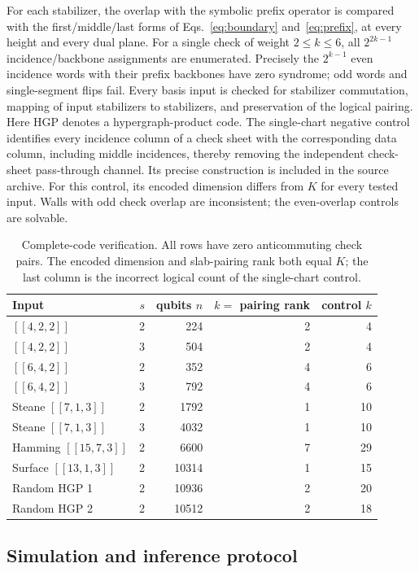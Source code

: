 For each stabilizer, the overlap with the symbolic prefix operator is
compared with the first/middle/last forms of Eqs.~\eqref{eq:boundary}
and~\eqref{eq:prefix}, at every height and every dual plane. For a single
check of weight $2\le k\le6$, all $2^{2k-1}$ incidence/backbone assignments
are enumerated. Precisely the $2^{k-1}$ even incidence words with their prefix
backbones have zero syndrome; odd words and single-segment flips fail.
Every basis input is checked for stabilizer commutation, mapping of input
stabilizers to stabilizers, and preservation of the logical pairing.
Here HGP denotes a hypergraph-product code. The single-chart negative
control identifies every incidence column of a check sheet with the
corresponding data column, including middle incidences, thereby removing
the independent check-sheet pass-through channel. Its precise construction
is included in the source archive. For this control, its encoded dimension
differs from $K$ for every tested input. Walls with odd check overlap are
inconsistent; the even-overlap controls are solvable.

\begin{table}[t]
\caption{Complete-code verification. All rows have zero anticommuting
check pairs. The encoded dimension and slab-pairing rank both equal $K$;
the last column is the incorrect logical count of the single-chart control.}
\label{tab:standalone-certificate}
\centering\scriptsize
\setlength{\tabcolsep}{3pt}
\begin{tabular}{@{}lrrrr@{}}
\toprule
Input & $s$ & qubits $n$ & $k=$ pairing rank & control $k$\\
\midrule
$[[4,2,2]]$ & 2 & 224 & 2 & 4\\
$[[4,2,2]]$ & 3 & 504 & 2 & 4\\
$[[6,4,2]]$ & 2 & 352 & 4 & 6\\
$[[6,4,2]]$ & 3 & 792 & 4 & 6\\
Steane $[[7,1,3]]$ & 2 & 1792 & 1 & 10\\
Steane $[[7,1,3]]$ & 3 & 4032 & 1 & 10\\
Hamming $[[15,7,3]]$ & 2 & 6600 & 7 & 29\\
Surface $[[13,1,3]]$ & 2 & 10314 & 1 & 15\\
Random HGP 1 & 2 & 10936 & 2 & 20\\
Random HGP 2 & 2 & 10512 & 2 & 18\\
\bottomrule
\end{tabular}
\end{table}

\subsection{Simulation and inference protocol}
\label{sec:simulation-protocol}
